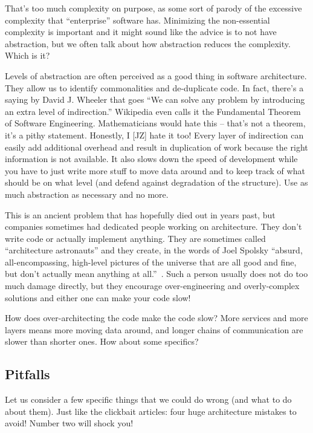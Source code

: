  
That's too much complexity on purpose, as some sort of parody of the excessive complexity that ``enterprise'' software has. Minimizing the non-essential complexity is important and it might sound like the advice is to not have abstraction, but we often talk about how abstraction reduces the complexity. Which is it?

Levels of abstraction are often perceived as a good thing in software architecture. They allow us to identify commonalities and de-duplicate code. In fact, there's a saying by David J. Wheeler that goes ``We can solve any problem by introducing an extra level of indirection.'' Wikipedia even calls it the Fundamental Theorem of Software Engineering. Mathematicians would hate this -- that's not a theorem, it's a pithy statement. Honestly, I [JZ] hate it too! Every layer of indirection can easily add additional overhead and result in duplication of work because the right information is not available. It also slows down the speed of development while you have to just write more stuff to move data around and to keep track of what should be on what level (and defend against degradation of the structure). Use as much abstraction as necessary and no more.

This is an ancient problem that has hopefully died out in years past, but companies sometimes had dedicated people working on architecture. They don't write code or actually implement anything. They are sometimes called ``architecture astronauts'' and they create, in the words of Joel Spolsky ``absurd, all-encompassing, high-level pictures of the universe that are all good and fine, but don’t actually mean anything at all.''~\cite{archastro}. Such a person usually does not do too much damage directly, but they encourage over-engineering and overly-complex solutions and either one can make your code slow!

How does over-architecting the code make the code slow? More services and more layers means more moving data around, and longer chains of communication are slower than shorter ones. How about some specifics?

\subsection*{Pitfalls}

Let us consider a few specific things that we could do wrong (and what to do about them). Just like the clickbait articles: four huge architecture mistakes to avoid! Number two will shock you! 

